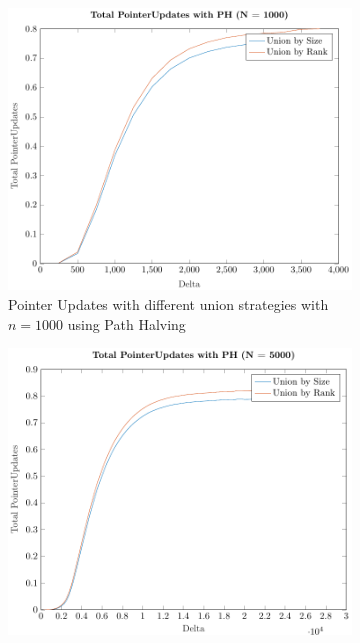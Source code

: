 \begin{figure}[ht]
    \begin{subfigure}{0.32\textwidth}
        \centering
        \includegraphics[width=\textwidth]{../images/plotPHNonFull1000_PointerUpdates.pdf}
        \caption{Pointer Updates with different union strategies with $n = 1000$ using Path Halving}
    \end{subfigure}%
    \hfill
    \begin{subfigure}{0.32\textwidth}
        \centering
        \includegraphics[width=\textwidth]{../images/plotPHNonFull5000_PointerUpdates.pdf}

\end{subfigure}
\end{figure}
